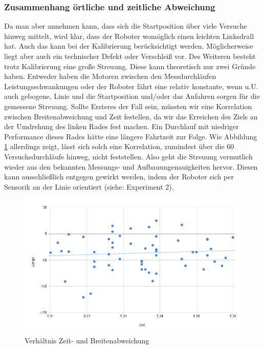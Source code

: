 \documentclass[ngerman]{tudscrreprt}
\begin{document}
\subsubsection{Zusammenhang örtliche und zeitliche Abweichung}
Da man aber annehmen kann, dass sich die Startposition über viele Versuche hinweg mittelt,
wird klar, dass der Roboter womöglich einen leichten Linksdrall hat. Auch das kann bei der
Kalibrierung berücksichtigt werden. Möglicherweise liegt aber auch ein technischer Defekt oder
Verschleiß vor. Des Weiteren besteht trotz Kalibrierung eine große Streuung. Diese kann
theoretisch nur zwei Gründe haben. Entweder haben die Motoren zwischen den
Messdurchläufen Leistungsschwankungen oder der Roboter fährt eine relativ konstante,
wenn u.U. auch gebogene, Linie und die Startposition und/oder das Anfahren sorgen für die
gemessene Streuung. Sollte Ersteres der Fall sein, müssten wir eine Korrelation zwischen
Breitenabweichung und Zeit festellen, da wir das Erreichen des Ziels an der Umdrehung des
linken Rades fest machen. Ein Durchlauf mit niedriger Performance dieses Rades hätte eine
längere Fahrtzeit zur Folge. Wie Abbildung \ref{figure:verhaeltnis_zeit_breite} allerdings
zeigt, lässt sich solch eine Korrelation, zumindest über die 60 Versuchsdurchläufe
hinweg, nicht feststellen. Also geht die Streuung vermutlich wieder aus den bekannten
Messungs- und Aufbauungenauigkeiten hervor. Diesen kann ausschließlich entgegen gewirkt
werden, indem der Roboter sich per Sensorik an der Linie orientiert (siehe: Experiment 2). 
%
\begin{figure}[H]
    \centering
    \includegraphics[scale=0.5]{src/charts/verhaeltnis_breite_zeit.png}
    \caption{Verhältnis Zeit- und Breitenabweichung}
    \label{figure:verhaeltnis_zeit_breite}
\end{figure}
%
\end{document}
